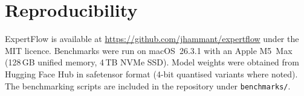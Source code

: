 \documentclass[11pt,a4paper]{article}
\begin{document}
\appendix
\section{Reproducibility}
\label{app:reproducibility}

ExpertFlow is available at \url{https://github.com/jhammant/expertflow}
under the MIT licence. Benchmarks were run on macOS~26.3.1 with an Apple
M5~Max (128\,GB unified memory, 4\,TB NVMe SSD). Model weights were obtained
from Hugging Face Hub in safetensor format (4-bit quantised variants where
noted). The benchmarking scripts are included in the repository under
\texttt{benchmarks/}.
\end{document}
